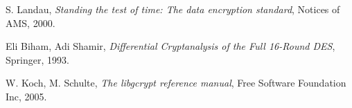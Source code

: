 \documentclass[11pt]{article}
\begin{document}
  \begin{thebibliography}{99}

      S. Landau,
      \textit{Standing the test of time: The data encryption standard},
      Notices of AMS,
      2000.

      Eli Biham, Adi Shamir,
      \textit{Differential Cryptanalysis of the Full 16-Round DES},
      Springer,
      1993.

      W. Koch, M. Schulte,
      \textit{The libgcrypt reference manual},
      Free Software Foundation Inc,
      2005.



  \end{thebibliography}
\end{document}
